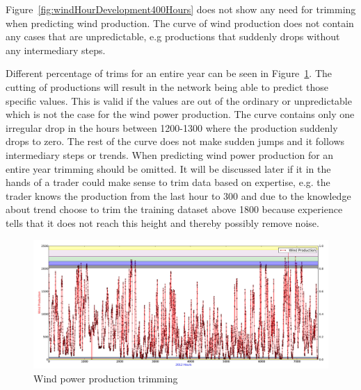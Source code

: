 Figure~\ref{fig:windHourDevelopment400Hours} does not show any need for trimming when predicting wind production. The curve of wind production does not contain any cases that are unpredictable, e.g productions that suddenly drops without any intermediary steps. 

Different percentage of trims for an entire year can be seen in Figure~\ref{fig:windProductionTrimming}. The cutting of productions will result in the network being able to predict those specific values. This is valid if the values are out of the ordinary or unpredictable which is not the case for the wind power production. The curve contains only one irregular drop in the hours between 1200-1300 where the production suddenly drops to zero. The rest of the curve does not make sudden jumps and it follows intermediary steps or trends. When predicting wind power production for an entire year trimming should be omitted. It will be discussed later if it in the hands of a trader could make sense to trim data based on expertise, e.g. the trader knows the production from the last hour to 300 and due to the knowledge about trend choose to trim the training dataset above 1800 because experience tells that it does not reach this height and thereby possibly remove noise.

\begin{figure}[H]
\centering
\includegraphics[width=0.99\linewidth,natwidth=898,natheight=587]{billeder/windProductionTrimming.jpg}
\caption{Wind power production trimming}
\label{fig:windProductionTrimming}
\end{figure}




